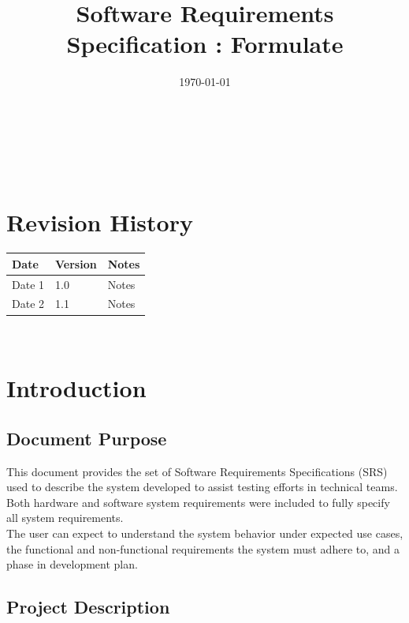 \documentclass[12pt]{article}
\begin{document}
\title{Software Requirements Specification \progname: Formulate} 

\author{\authname}
\date{\today}
	
\maketitle

~\newpage


\tableofcontents

~\newpage

\section*{Revision History}

\begin{tabularx}{\textwidth}{p{3cm}p{2cm}X}
\toprule {\bf Date} & {\bf Version} & {\bf Notes}\\
\midrule
Date 1 & 1.0 & Notes\\
Date 2 & 1.1 & Notes\\
\bottomrule
\end{tabularx}

~\newpage

\section{Introduction}

\subsection{Document Purpose}

This document provides the set of Software Requirements Specifications (SRS) used to describe the system developed to assist testing efforts in technical teams. Both hardware and software system requirements were included to fully specify all system requirements. \\

The user can expect to understand the system behavior under expected use cases, the functional and non-functional requirements the system must adhere to, and a phase in development plan.\\

\subsection{Project Description}
\end{document}
